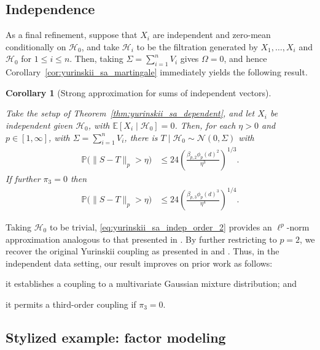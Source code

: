 \documentclass[11pt,lof]{puthesis}
\renewcommand{\P}{\ensuremath{\mathbb{P}}}
\newcommand{\E}{\ensuremath{\mathbb{E}}}
\newcommand{\cH}{\ensuremath{\mathcal{H}}}
\newcommand{\cN}{\ensuremath{\mathcal{N}}}
\theoremstyle{break}
\newtheorem{corollary}{Corollary}[section]
\theoremstyle{proof}
\begin{document}
\subsection{Independence}

As a final refinement, suppose that $X_i$ are independent and
zero-mean conditionally on $\cH_0$,
and take $\cH_i$ to be the filtration
generated by $X_1, \ldots, X_i$ and $\cH_0$ for $1 \leq i \leq n$.
Then, taking $\Sigma = \sum_{i=1}^n V_i$
gives $\Omega = 0$, and hence Corollary~\ref{cor:yurinskii_sa_martingale}
immediately yields the following result.
%
\begin{corollary}[Strong approximation for sums of independent vectors]%
\label{cor:yurinskii_sa_indep}

Take the setup of Theorem~\ref{thm:yurinskii_sa_dependent},
and let $X_i$ be independent given $\cH_0$,
with $\E[X_i \mid \cH_0] = 0$.
Then, for each $\eta > 0$ and $p \in [1,\infty]$,
with $\Sigma = \sum_{i=1}^n V_i$,
there is $T \mid \cH_0 \sim \cN(0, \Sigma)$ with
%
\begin{align}
\label{eq:yurinskii_sa_indep_order_2}
\P\big(\|S-T\|_p > \eta\big)
&\leq 24 \left( \frac{\beta_{p,2} \phi_p(d)^2}{\eta^3} \right)^{1/3}.
\end{align}
%
If further $\pi_3 = 0$ then
%
\begin{align*}
\P\big(\|S-T\|_p > \eta\big)
&\leq 24 \left( \frac{\beta_{p,3} \phi_p(d)^3}{\eta^4} \right)^{1/4}.
\end{align*}
%
\end{corollary}

Taking $\cH_0$ to be trivial,
\eqref{eq:yurinskii_sa_indep_order_2} provides an $\ell^p$-norm approximation
analogous to that presented in \citet{belloni2019conditional}.
By further
restricting to $p=2$, we recover the original Yurinskii coupling as presented
in \citet[Theorem~1]{lecam1988} and \citet[Theorem~10]{pollard2002user}. Thus,
in the independent data setting, our result improves on prior work as follows:
\begin{inlineroman}
\item
it establishes a coupling to a multivariate Gaussian mixture distribution;
and
\item
it permits a third-order coupling if $\pi_3=0$.
\end{inlineroman}

\subsection{Stylized example: factor modeling}
\label{sec:yurinskii_factor}
\end{document}
